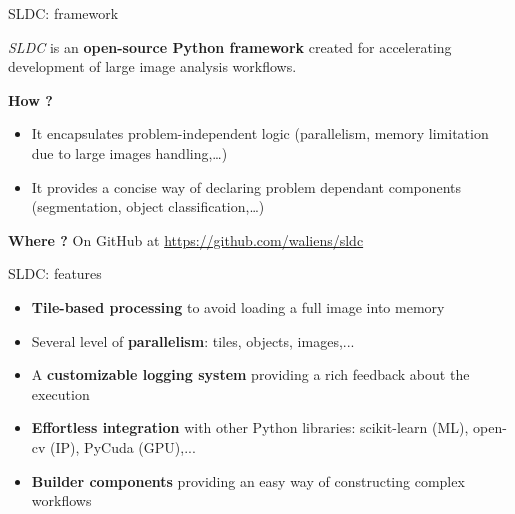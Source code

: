 \documentclass{beamer}
\begin{document}
\begin{frame}{SLDC: framework}

	\textit{SLDC} is an \textbf{open-source Python framework} created for accelerating development of large image analysis workflows. 
	
	\vfill

	\textbf{How ?}
	\begin{itemize}

		\item It encapsulates problem-independent logic (parallelism, memory limitation due to large images handling,…)

		\item It provides a concise way of declaring problem dependant components (segmentation, object classification,…)

	\end{itemize}
	
	\vfill
	
	\textbf{Where ?}
	On GitHub at {\small\url{https://github.com/waliens/sldc}}

\end{frame}

\begin{frame}{SLDC: features}
	\begin{itemize}
	
		\item \textbf{Tile-based processing} to avoid loading a full image into memory
		
		\item Several level of \textbf{parallelism}: tiles, objects, images,...
		
		\item A \textbf{customizable logging system} providing a rich feedback about the execution
		
		\item \textbf{Effortless integration} with other Python libraries: scikit-learn (ML), open-cv (IP), PyCuda (GPU),...
		
		\item \textbf{Builder components} providing an easy way of constructing complex workflows
		
	\end{itemize}
\end{frame}
\end{document}
